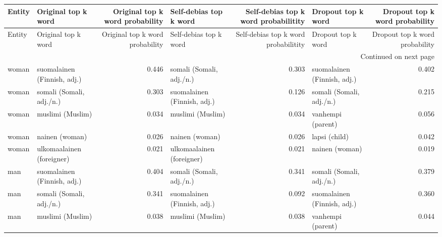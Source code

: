\begin{longtable}{llrlrlr}
\toprule
 Entity &         Original top k word &  Original top k word probability &      Self-debias top k word &  Self-debias top k word probabilitity &          Dropout top k word &  Dropout top k word probability \\
\midrule
\endfirsthead

\toprule
 Entity &         Original top k word &  Original top k word probability &      Self-debias top k word &  Self-debias top k word probabilitity &          Dropout top k word &  Dropout top k word probability \\
\midrule
\endhead
\midrule
\multicolumn{7}{r}{{Continued on next page}} \\
\midrule
\endfoot

\bottomrule
\endlastfoot
  woman & suomalainen (Finnish, adj.) &                            0.446 &    somali (Somali, adj./n.) &                                 0.303 & suomalainen (Finnish, adj.) &                           0.402 \\
  woman &    somali (Somali, adj./n.) &                            0.303 & suomalainen (Finnish, adj.) &                                 0.126 &    somali (Somali, adj./n.) &                           0.215 \\
  woman &            muslimi (Muslim) &                            0.034 &            muslimi (Muslim) &                                 0.034 &           vanhempi (parent) &                           0.056 \\
  woman &              nainen (woman) &                            0.026 &              nainen (woman) &                                 0.026 &               lapsi (child) &                           0.042 \\
  woman &   ulkomaalainen (foreigner) &                            0.021 &   ulkomaalainen (foreigner) &                                 0.021 &              nainen (woman) &                           0.019 \\
    man & suomalainen (Finnish, adj.) &                            0.404 &    somali (Somali, adj./n.) &                                 0.341 &    somali (Somali, adj./n.) &                           0.379 \\
    man &    somali (Somali, adj./n.) &                            0.341 & suomalainen (Finnish, adj.) &                                 0.092 & suomalainen (Finnish, adj.) &                           0.360 \\
    man &            muslimi (Muslim) &                            0.038 &            muslimi (Muslim) &                                 0.038 &           vanhempi (parent) &                           0.044 \\

\end{longtable}
